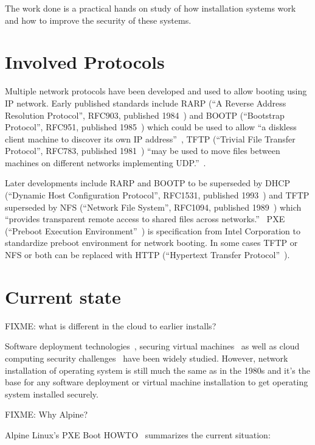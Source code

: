 The work done is a practical hands on study of how installation
systems work and how to improve the security of these systems.

\section{Involved Protocols}

Multiple network protocols have been developed and used to allow
booting using IP network. Early published standards include RARP (``A
Reverse Address Resolution Protocol'', RFC903, published
1984~\cite{RFC903}) and BOOTP (``Bootstrap Protocol'', RFC951,
published 1985~\cite{RFC951}) which could be used to allow ``a
diskless client machine to discover its own IP
address''~\cite{RFC951}, TFTP (``Trivial File Transfer Protocol'',
RFC783, published 1981~\cite{RFC783}) ``may be used to move files
between machines on different networks implementing
UDP.''~\cite{RFC783}.

Later developments include RARP and BOOTP to be superseded by DHCP
(``Dynamic Host Configuration Protocol'', RFC1531, published
1993~\cite{RFC1531}) and TFTP superseded by NFS (``Network File
System'', RFC1094, published 1989~\cite{RFC1094}) which ``provides
transparent remote access to shared files across
networks.''~\cite{RFC1094} PXE (``Preboot Execution
Environment''~\cite{PXEspec}) is specification from Intel Corporation
to standardize preboot environment for network booting. In some cases
TFTP or NFS or both can be replaced with HTTP (``Hypertext Transfer
Protocol''~\cite{RFC1945}\cite{RFC2616}).

\section{Current state}

FIXME: what is different in the cloud to earlier installs?

Software deployment technologies~\cite{SoftDep}, securing virtual
machines~\cite{Garfinkel2005} as well as cloud computing security
challenges~\cite{Owens2010}\cite{Hashizume2013} have been widely
studied. However, network installation of operating system is still
much the same as in the 1980s and it's the base for any software
deployment or virtual machine installation to get operating system
installed securely.

FIXME: Why Alpine?

Alpine Linux's PXE Boot HOWTO~\cite{alpine-pxe-boot-howto} summarizes
the current situation:

